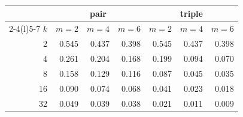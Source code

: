 \footnotesize
\begin{tabular}{rrrrrrr}
\toprule
& \multicolumn{3}{c}{pair} & \multicolumn{3}{c}{triple} \\ \cmidrule(lr){2-4}\cmidrule(l){5-7}
$k$ & $m=2$ & $m=4$ & $m=6$ & $m=2$ & $m=4$ & $m=6$ \\
\midrule
2 & 0.545 & 0.437 & 0.398 & 0.545 & 0.437 & 0.398 \\
4 & 0.261 & 0.204 & 0.168 & 0.199 & 0.094 & 0.070 \\
8 & 0.158 & 0.129 & 0.116 & 0.087 & 0.045 & 0.035 \\
16 & 0.090 & 0.074 & 0.068 & 0.041 & 0.023 & 0.018 \\
32 & 0.049 & 0.039 & 0.038 & 0.021 & 0.011 & 0.009 \\
\bottomrule
\end{tabular}

